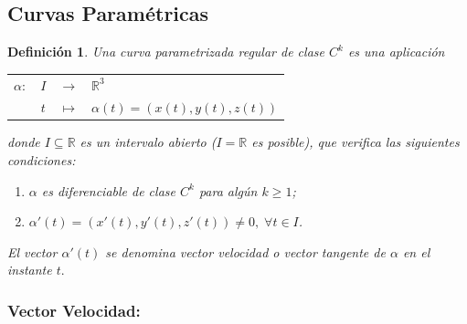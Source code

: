 \documentclass[ebook,oneside]{memoir}
\newtheorem{defn}[thm]{Definición}
\begin{document}
\subsection{Curvas Paramétricas}

\begin{defn}
Una curva parametrizada regular de clase $C^k$  es una aplicación
\begin{center}
\begin{tabular}{cccl}
$\alpha:$ & $I$ & $\longrightarrow$ &$\mathbb{R}^3$ \\
 & $t$ & $\mapsto$ & $\alpha (t)
=(x(t),y(t),z(t))$
\end{tabular}
\end{center}

donde $I\subseteq {\mathbb{R}}$ es un intervalo abierto ($I=\mathbb{R} $ es posible), que verifica las siguientes condiciones:

\begin{enumerate}
\item $\alpha$ es diferenciable de clase $C^k$ para alg\'{u}n $k\geq1$;
\item  $\alpha '(t)=(x'(t),y'(t),z'(t)) \neq 0, \; \forall t\in I$.
\end{enumerate}
El vector $\alpha '(t)$ se de\-no\-mina vector velocidad o vector tangente de $\alpha$ en el instante $t.$
\end{defn}


\subsubsection{Vector Velocidad:}
\end{document}
